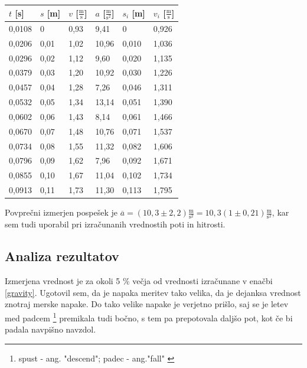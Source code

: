 \documentclass[12pt]{article}
\begin{document}
	\begin{table}[h!]
		\centering
		\begin{tabular}{|l|l|l|l|l|l|}
		\hline
		$t$ [s] 	& $s$ [m] 	& $v$ [$\frac{\text{m}}{\text{s}}$] & $a$ [$\frac{\text{m}}{\text{s}^2}$] 	& $s_i$ [m] 	& $v_i$ [$\frac{\text{m}}{\text{s}}$] 	\\ \hline
		0,0108		& 0			& 0,93								&  9,41									& 0				& 0,926									\\ \hline
		0,0206		& 0,01		& 1,02								& 10,96									& 0,010			& 1,036									\\ \hline
		0,0296		& 0,02		& 1,12								&  9,60									& 0,020			& 1,135									\\ \hline
		0,0379		& 0,03		& 1,20								& 10,92									& 0,030			& 1,226									\\ \hline
		0,0457		& 0,04		& 1,28								&  7,26									& 0,046			& 1,311									\\ \hline
		0,0532		& 0,05		& 1,34								& 13,14									& 0,051			& 1,390									\\ \hline
		0,0602		& 0,06		& 1,43								&  8,14									& 0,061			& 1,466									\\ \hline
		0,0670		& 0,07		& 1,48								& 10,76									& 0,071			& 1,537									\\ \hline
		0,0734		& 0,08		& 1,55								& 11,32									& 0,082			& 1,606									\\ \hline
		0,0796		& 0,09		& 1,62								&  7,96									& 0,092			& 1,671									\\ \hline
		0,0855		& 0,10		& 1,67								& 11,04									& 0,102			& 1,734									\\ \hline
		0,0913		& 0,11		& 1,73								& 11,30									& 0,113			& 1,795									\\ \hline
		\end{tabular}
	\end{table}

	Povprečni izmerjen pospešek je $\overline{a} = (10,3 \pm 2,2) \frac{\text{m}}{\text{s}^2} = 10,3 (1 \pm 0,21) \frac{\text{m}}{\text{s}^2}$, kar
	sem tudi uporabil pri izračunanih vrednostih poti in hitrosti.
 	\subsection*{Analiza rezultatov}
	Izmerjena vrednost je za okoli 5 \% večja od vrednosti izračunane v enačbi \eqref{gravity}.
	Ugotovil sem, da je napaka meritev tako velika, da je dejanksa vrednost znotraj merske
	napake. Do tako velike napake je verjetno prišlo, saj se je letev med padcem 
	\footnote{spust - ang. "descend"; padec - ang."fall" \cite{fallvsdescent}}
	premikala tudi bočno, s tem pa prepotovala daljšo pot, kot če bi padala navpišno navzdol.
\end{document}
